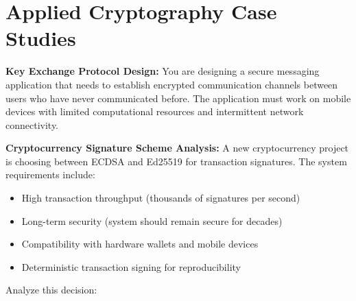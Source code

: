 \documentclass[10pt,a4paper,american]{exam}
\begin{document}
\section*{Applied Cryptography Case Studies}
\begin{questions}
	\question[10] \textbf{Key Exchange Protocol Design:}
	You are designing a secure messaging application that needs to establish encrypted communication channels between users who have never communicated before. The application must work on mobile devices with limited computational resources and intermittent network connectivity.

	\question[10] \textbf{Cryptocurrency Signature Scheme Analysis:}
	A new cryptocurrency project is choosing between ECDSA and Ed25519 for transaction signatures. The system requirements include:
	\begin{itemize}
		\item High transaction throughput (thousands of signatures per second)
		\item Long-term security (system should remain secure for decades)
		\item Compatibility with hardware wallets and mobile devices
		\item Deterministic transaction signing for reproducibility
	\end{itemize}
	Analyze this decision:
	\begin{parts}

\end{parts}
\end{questions}
\end{document}
